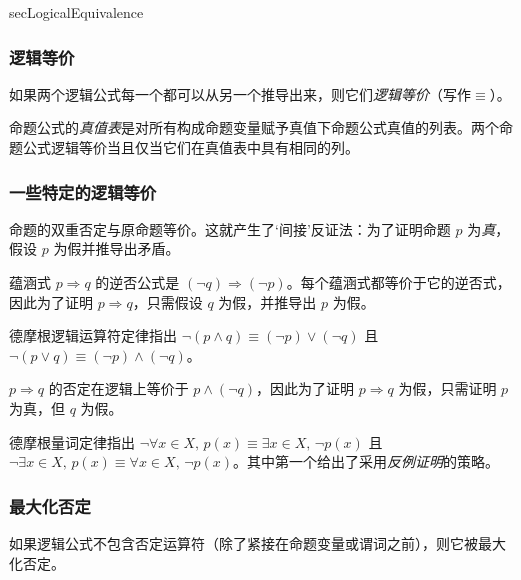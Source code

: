 \begin{tldr}{secLogicalEquivalence}
\subsubsection*{逻辑等价}

\begin{tldrlist}
如果两个逻辑公式每一个都可以从另一个推导出来，则它们\textit{逻辑等价}（写作$\equiv$）。

命题公式的\textit{真值表}是对所有构成命题变量赋予真值下命题公式真值的列表。两个命题公式逻辑等价当且仅当它们在真值表中具有相同的列。
\end{tldrlist}

\subsubsection*{一些特定的逻辑等价}

\begin{tldrlist}
命题的双重否定与原命题等价。这就产生了`间接'反证法：为了证明命题 $p$ 为\textit{真}，假设 $p$ 为假并推导出矛盾。

蕴涵式 $p \Rightarrow q$ 的逆否公式是 $(\neg q) \Rightarrow (\neg p)$。每个蕴涵式都等价于它的逆否式，因此为了证明 $p \Rightarrow q$，只需假设 $q$ 为假，并推导出 $p$ 为假。

德摩根逻辑运算符定律指出 $\neg (p \wedge q) \equiv (\neg p) \vee (\neg q)$ 且 $\neg (p \vee q) \equiv (\neg p) \wedge (\neg q)$。

$p \Rightarrow q$ 的否定在逻辑上等价于 $p \wedge (\neg q)$，因此为了证明 $p \Rightarrow q$ 为假，只需证明 $p$ 为真，但 $q$ 为假。

德摩根量词定律指出 $\neg \forall x \in X,\, p(x) \equiv \exists x \in X,\, \neg p(x)$ 且 $\neg \exists x \in X,\, p(x) \equiv \forall x \in X,\, \neg p(x)$。其中第一个给出了采用\textit{反例证明}的策略。
\end{tldrlist}

\subsubsection*{最大化否定}

\begin{tldrlist}
如果逻辑公式不包含否定运算符（除了紧接在命题变量或谓词之前），则它被最大化否定。


\end{tldrlist}
\end{tldr}
